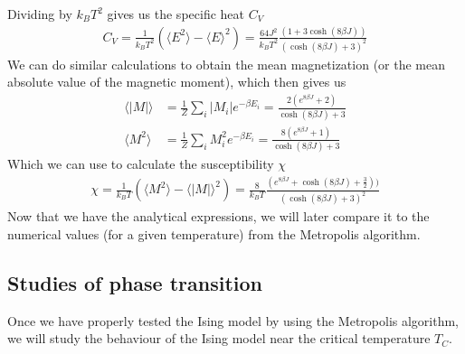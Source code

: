 \documentclass[12pt]{article}
\begin{document}
Dividing by $k_B T^2$ gives us the specific heat $C_V$
\begin{align}
C_V = \frac{1}{k_BT^2} \left( \langle E^2 \rangle
- \langle E \rangle^2 \right) = \frac{64J^2}{k_B T^2} \frac{(1+3\cosh(8\beta J))}{(\cosh(8\beta J) + 3)^2}
\label{eq:heat_capacity}
\end{align}
We can do similar calculations to obtain the mean magnetization (or the mean absolute value of the magnetic moment), which then gives us
\begin{align*}
\langle |M|\rangle &= \frac{1}{Z} \displaystyle \sum_i |M_i| e^{-\beta E_i} = \frac{2(e^{8\beta J} + 2)}{\cosh(8\beta J) + 3} \\
\langle M^2\rangle &= \frac{1}{Z}\displaystyle \sum_i M_i^2e^{-\beta E_i} = \frac{8(e^{8\beta J} + 1)}{\cosh(8\beta J) + 3}
\end{align*}
Which we can use to calculate the susceptibility $\chi$
\begin{align}
\chi = \frac{1}{k_B T} \left(\langle M^2 \rangle - \langle |M| \rangle^2\right) = \frac{8}{k_B T} \frac{(e^{8\beta J}+ \cosh(8\beta J) + \frac{3}{2}))}{(\cosh(8\beta J) + 3)^2}
\label{eq:suceptibility}
\end{align} 
Now that we have the analytical expressions, we will later compare it to the numerical values (for a given temperature) from the Metropolis algorithm.
\FloatBarrier

\subsection{Studies of phase transition}
Once we have properly tested the Ising model by using the Metropolis algorithm, we will study the behaviour of the Ising model near the critical temperature $T_C$. 
\end{document}
